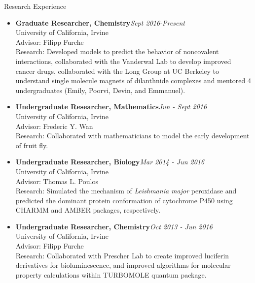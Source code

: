 \documentclass{resume} %
\begin{document}
\vspace{-0.5cm}
\begin{rSection}{Research Experience}

\begin{itemize}
\item[] \textbf{Graduate Researcher, Chemistry}\hfill {\em Sept 2016-Present}\\
  University of California, Irvine\\
  Advisor: Filipp Furche \\
  Research: Developed models to predict the behavior of noncovalent interactions,
  collaborated with the Vanderwal Lab to develop improved cancer drugs, collaborated
  with the Long Group at UC Berkeley to understand single molecule magnets of dilanthnide
  complexes and mentored 4 undergraduates (Emily, Poorvi, Devin, and Emmanuel).

\item[] \textbf{Undergraduate Researcher, Mathematics}\hfill {\em Jun - Sept 2016}\\
  University of California, Irvine \\
  Advisor: Frederic Y. Wan\\
  Research: Collaborated with mathematicians to model the early development of fruit fly.
  
\item[] \textbf{Undergraduate Researcher, Biology}\hfill {\em Mar 2014 - Jun 2016}\\
  University of California, Irvine \\
  Advisor: Thomas L. Poulos \\
  Research: Simulated the mechanism of \textit{Leishmania major} peroxidase
  and predicted the dominant protein conformation of cytochrome P450 using CHARMM and
  AMBER packages, respectively.

\item[] \textbf{Undergraduate Researcher, Chemistry}\hfill {\em Oct 2013 - Jun 2016}\\
  University of California, Irvine\\
  Advisor: Filipp Furche \\
  Research: Collaborated with Prescher Lab to create improved luciferin derivatives
  for bioluminescence, and improved algorithms for molecular property calculations
  within TURBOMOLE quantum package.
\end{itemize}

\end{rSection}
\end{document}
